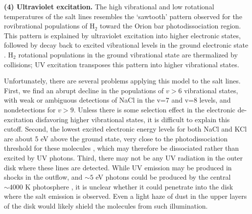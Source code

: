 \documentclass[12pt]{article}
\newcommand{\hh}{\ensuremath{\textrm{H}_{2}}\xspace}			%
\begin{document}
\par{\textbf{(4) Ultraviolet excitation.}}
%
%
The high vibrational and low rotational temperatures of the
salt lines resembles the `sawtooth' pattern observed for the rovibrational
populations of \hh toward the Orion bar photodissociation region.  This
pattern is explained by ultraviolet excitation into higher electronic states,
followed by decay back to excited vibrational levels in the ground electronic
state \cite{Kaplan2017a}.  \hh rotational populations in the ground vibrational
state are thermalized by collisions; UV excitation transposes this pattern into
higher vibrational states.


Unfortunately, there are several problems applying this model to the salt lines.
First, we find an abrupt decline in the populations of $v > 6$ vibrational states,
with weak or ambiguous detections of NaCl in the v=7 and v=8 levels, and
nondetections for $v > 9$.  Unless there is
some selection effect in the electronic de-excitation disfavoring higher vibrational
states, it is difficult to explain this cutoff.  
Second, the lowest excited electronic energy levels for both NaCl and KCl are about
5 eV above the ground state, very close to the photodissociation threshold for these
molecules \cite{Zeiri1983, Silver1986}, which
may therefore be dissociated rather than excited by UV photons.
Third, there may not be any UV radiation in the outer disk where these lines
are detected.  
While UV
emission may be produced in shocks in the outflow, and $\sim5$ eV photons
could be produced by the central $\sim4000$ K photosphere \cite{Testi2010a},
it is unclear whether it could penetrate into the disk where the salt emission
is observed.  Even a light haze of dust in the upper layers of the disk would
likely shield the molecules from such illumination.
\end{document}
